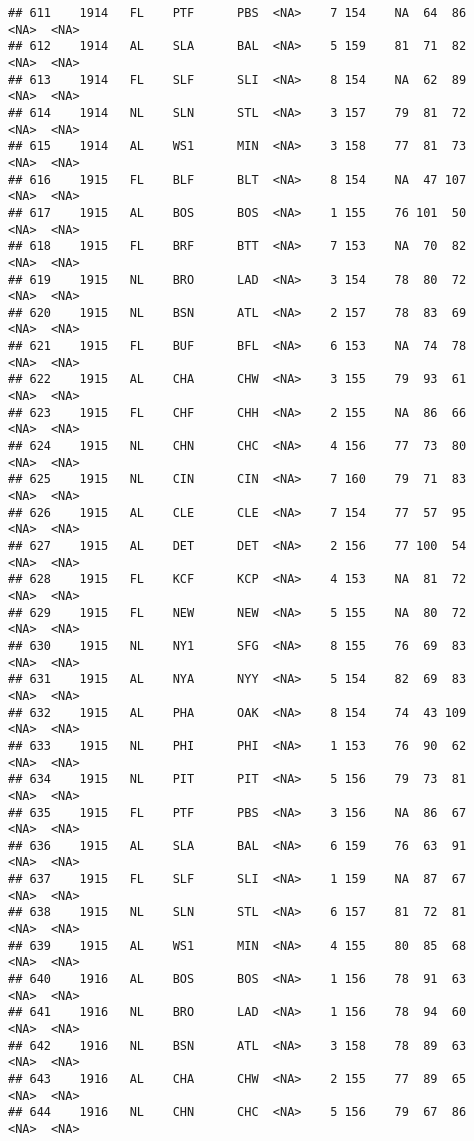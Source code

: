 \documentclass[]{article}
\begin{document}
\begin{verbatim}
## 611    1914   FL    PTF      PBS  <NA>    7 154    NA  64  86   <NA>  <NA>
## 612    1914   AL    SLA      BAL  <NA>    5 159    81  71  82   <NA>  <NA>
## 613    1914   FL    SLF      SLI  <NA>    8 154    NA  62  89   <NA>  <NA>
## 614    1914   NL    SLN      STL  <NA>    3 157    79  81  72   <NA>  <NA>
## 615    1914   AL    WS1      MIN  <NA>    3 158    77  81  73   <NA>  <NA>
## 616    1915   FL    BLF      BLT  <NA>    8 154    NA  47 107   <NA>  <NA>
## 617    1915   AL    BOS      BOS  <NA>    1 155    76 101  50   <NA>  <NA>
## 618    1915   FL    BRF      BTT  <NA>    7 153    NA  70  82   <NA>  <NA>
## 619    1915   NL    BRO      LAD  <NA>    3 154    78  80  72   <NA>  <NA>
## 620    1915   NL    BSN      ATL  <NA>    2 157    78  83  69   <NA>  <NA>
## 621    1915   FL    BUF      BFL  <NA>    6 153    NA  74  78   <NA>  <NA>
## 622    1915   AL    CHA      CHW  <NA>    3 155    79  93  61   <NA>  <NA>
## 623    1915   FL    CHF      CHH  <NA>    2 155    NA  86  66   <NA>  <NA>
## 624    1915   NL    CHN      CHC  <NA>    4 156    77  73  80   <NA>  <NA>
## 625    1915   NL    CIN      CIN  <NA>    7 160    79  71  83   <NA>  <NA>
## 626    1915   AL    CLE      CLE  <NA>    7 154    77  57  95   <NA>  <NA>
## 627    1915   AL    DET      DET  <NA>    2 156    77 100  54   <NA>  <NA>
## 628    1915   FL    KCF      KCP  <NA>    4 153    NA  81  72   <NA>  <NA>
## 629    1915   FL    NEW      NEW  <NA>    5 155    NA  80  72   <NA>  <NA>
## 630    1915   NL    NY1      SFG  <NA>    8 155    76  69  83   <NA>  <NA>
## 631    1915   AL    NYA      NYY  <NA>    5 154    82  69  83   <NA>  <NA>
## 632    1915   AL    PHA      OAK  <NA>    8 154    74  43 109   <NA>  <NA>
## 633    1915   NL    PHI      PHI  <NA>    1 153    76  90  62   <NA>  <NA>
## 634    1915   NL    PIT      PIT  <NA>    5 156    79  73  81   <NA>  <NA>
## 635    1915   FL    PTF      PBS  <NA>    3 156    NA  86  67   <NA>  <NA>
## 636    1915   AL    SLA      BAL  <NA>    6 159    76  63  91   <NA>  <NA>
## 637    1915   FL    SLF      SLI  <NA>    1 159    NA  87  67   <NA>  <NA>
## 638    1915   NL    SLN      STL  <NA>    6 157    81  72  81   <NA>  <NA>
## 639    1915   AL    WS1      MIN  <NA>    4 155    80  85  68   <NA>  <NA>
## 640    1916   AL    BOS      BOS  <NA>    1 156    78  91  63   <NA>  <NA>
## 641    1916   NL    BRO      LAD  <NA>    1 156    78  94  60   <NA>  <NA>
## 642    1916   NL    BSN      ATL  <NA>    3 158    78  89  63   <NA>  <NA>
## 643    1916   AL    CHA      CHW  <NA>    2 155    77  89  65   <NA>  <NA>
## 644    1916   NL    CHN      CHC  <NA>    5 156    79  67  86   <NA>  <NA>

\end{verbatim}
\end{document}
